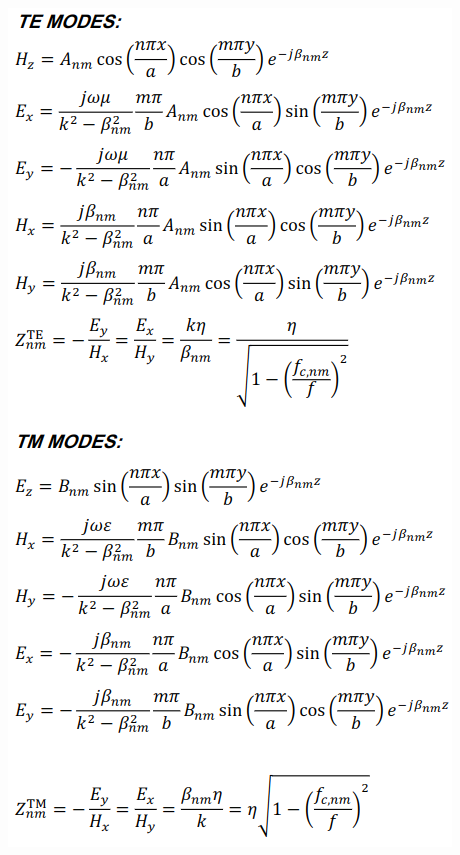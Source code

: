 \documentclass[11pt,landscape]{article}
\begin{document}
\begin{multicols}{3}
\includegraphics[width=\columnwidth]{tem_modes.png}

\end{multicols}
\end{document}
